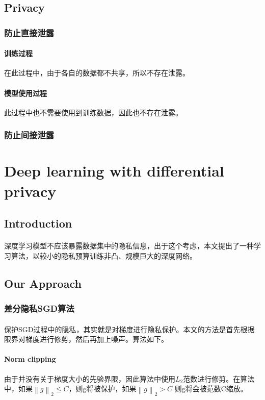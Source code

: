 \documentclass[12pt,a4paper]{article}
\begin{document}
\subsection{Privacy}
\subsubsection{防止直接泄露}
\paragraph{训练过程} 在此过程中，由于各自的数据都不共享，所以不存在泄露。
\paragraph{模型使用过程} 此过程中也不需要使用到训练数据，因此也不存在泄露。

\subsubsection{防止间接泄露}

\section{Deep learning with differential privacy\cite{abadi2016deep} }
\subsection{Introduction}
\paragraph{} 深度学习模型不应该暴露数据集中的隐私信息，出于这个考虑，本文提出了一种学习算法，以较小的隐私预算训练非凸、规模巨大的深度网络。
\subsection{Our Approach}
\subsubsection{差分隐私SGD算法}
\paragraph{} 保护SGD过程中的隐私，其实就是对梯度进行隐私保护。本文的方法是首先根据限界对梯度进行修剪，然后再加上噪声。算法如下。
\paragraph{Norm clipping} 由于并没有关于梯度大小的先验界限，因此算法中使用$L_2$范数进行修剪。在算法中，如果$\left \| g \right \|_2 \leq C$，则g将被保护，如果$\left \| g \right \|_2 > C$ 则g将会被范数C缩放。
\end{document}
